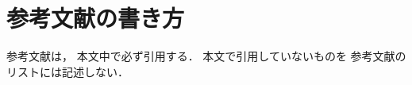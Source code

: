 \documentclass[a4paper,twocolumn,twoside,10pt]{jarticle}
\begin{document}
\lhead{}
\rhead{}

%



\section{参考文献の書き方}
参考文献は，
本文中で必ず引用する\cite{ohtsuki2008a}．
本文で引用していないものを
参考文献のリストには記述しない\cite{amari89a,radford2015a}．


% 

\end{document}
